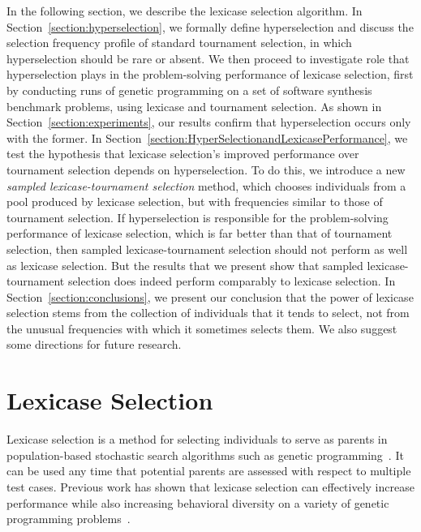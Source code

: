 \documentclass{sig-alternate}
\begin{document}
In the following section, we  describe the lexicase selection algorithm. In Section~\ref{section:hyperselection}, we formally define hyperselection and discuss the selection frequency profile of standard tournament selection, in which hyperselection should be rare or absent. We then proceed to investigate role that hyperselection plays in the problem-solving performance of lexicase selection, first by conducting runs of genetic programming on a set of software synthesis benchmark problems, using lexicase and tournament selection. As shown in Section~\ref{section:experiments}, our results confirm that hyperselection occurs only with the former. In Section~\ref{section:HyperSelectionandLexicasePerformance}, we test the hypothesis that   lexicase selection's improved performance over tournament selection depends on hyperselection. To do this, we introduce a new \emph{sampled lexicase-tournament selection} method, which chooses individuals from a pool produced by lexicase selection, but with frequencies similar to those of tournament selection. If hyperselection is responsible for the problem-solving performance of lexicase selection, which is far better than that of tournament selection, then sampled lexicase-tournament selection should not perform as well as lexicase selection. But the results that we present show that sampled lexicase-tournament selection does indeed perform comparably to lexicase selection. In Section~\ref{section:conclusions}, we present our conclusion that the power of lexicase selection stems from the collection of individuals that it tends to select, not from the unusual frequencies with which it sometimes selects them. We also suggest some directions for future research.


\section{Lexicase Selection}
\label{section:lexicase}


Lexicase selection is a method for selecting individuals to serve as parents in population-based stochastic search algorithms such as genetic programming~\cite{Helmuth:2014:ieeeTEC, Spector:2012:GECCOcompANEW}. %
It can be used any time that potential parents are assessed with respect to multiple test cases.
Previous work has shown that lexicase selection can effectively increase performance while also increasing behavioral diversity on a variety of genetic programming problems~\cite{Helmuth:2015:GECCO, Helmuth:2014:ieeeTEC, Krawiec:2015:GECCO:smgpWorkshop, Helmuth:2015:GPTP}.
\end{document}

